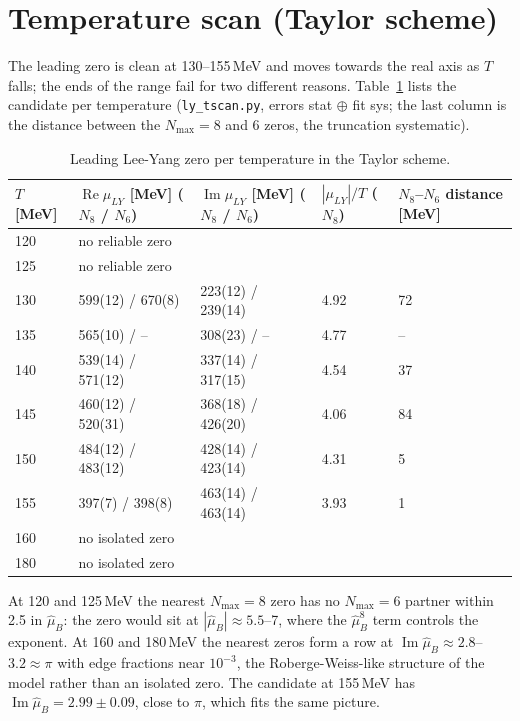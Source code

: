 \documentclass[11pt,a4paper]{article}
\newcommand{\hmu}{\hat{\mu}_B}
\newcommand{\Nmax}{N_{\max}}
\newcommand{\code}[1]{\texttt{#1}}
\begin{document}
\section{Temperature scan (Taylor scheme)}

The leading zero is clean at 130--155\,MeV and moves towards the real axis as $T$ falls; the ends of the range fail for two different reasons. Table~\ref{tab:tscan} lists the candidate per temperature (\code{ly\_tscan.py}, errors stat $\oplus$ fit sys; the last column is the distance between the $\Nmax=8$ and 6 zeros, the truncation systematic).

\begin{table}[H]
\centering\small
\begin{tabular}{lllll}
\toprule
$T$ [MeV] & $\operatorname{Re}\mu_{LY}$ [MeV] ($N_8$ / $N_6$) & $\operatorname{Im}\mu_{LY}$ [MeV] ($N_8$ / $N_6$) & $|\mu_{LY}|/T$ ($N_8$) & $N_8$--$N_6$ distance [MeV] \\
\midrule
120 & no reliable zero & & & \\
125 & no reliable zero & & & \\
130 & 599(12) / 670(8) & 223(12) / 239(14) & 4.92 & 72 \\
135 & 565(10) / -- & 308(23) / -- & 4.77 & -- \\
140 & 539(14) / 571(12) & 337(14) / 317(15) & 4.54 & 37 \\
145 & 460(12) / 520(31) & 368(18) / 426(20) & 4.06 & 84 \\
150 & 484(12) / 483(12) & 428(14) / 423(14) & 4.31 & 5 \\
155 & 397(7) / 398(8) & 463(14) / 463(14) & 3.93 & 1 \\
160 & no isolated zero & & & \\
180 & no isolated zero & & & \\
\bottomrule
\end{tabular}
\caption{Leading Lee-Yang zero per temperature in the Taylor scheme.}
\label{tab:tscan}
\end{table}

At 120 and 125\,MeV the nearest $\Nmax=8$ zero has no $\Nmax=6$ partner within 2.5 in $\hmu$: the zero would sit at $|\hmu|\approx5.5$--7, where the $\hmu^8$ term controls the exponent. At 160 and 180\,MeV the nearest zeros form a row at $\operatorname{Im}\hmu\approx2.8$--$3.2\approx\pi$ with edge fractions near $10^{-3}$, the Roberge-Weiss-like structure of the model rather than an isolated zero. The candidate at 155\,MeV has $\operatorname{Im}\hmu=2.99\pm0.09$, close to $\pi$, which fits the same picture.
\end{document}

